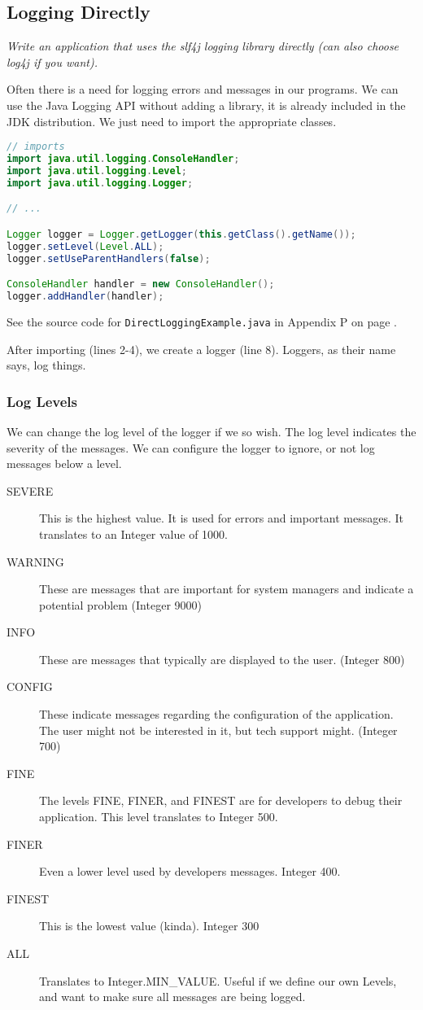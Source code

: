 \subsection{Logging Directly}
\textit{Write an application that uses the slf4j logging library directly (can also choose log4j if you want).}

Often there is a need for logging errors and messages in our programs. We can use the Java Logging API without adding a library, it is already included in the JDK distribution. We just need to import the appropriate classes.
\begin{lstlisting}[language=Java, label=lst:javaloggerlst]
// imports
import java.util.logging.ConsoleHandler;
import java.util.logging.Level;
import java.util.logging.Logger;

// ...

Logger logger = Logger.getLogger(this.getClass().getName());
logger.setLevel(Level.ALL);
logger.setUseParentHandlers(false);

ConsoleHandler handler = new ConsoleHandler();
logger.addHandler(handler);
\end{lstlisting}

See the source code for \texttt{DirectLoggingExample.java} in Appendix P on page \pageref{App:AppendixP}.

After importing (lines 2-4), we create a logger (line 8). Loggers, as their name says, log things. 

\subsubsection{Log Levels}
We can change the log level of the logger if we so wish. The log level indicates the severity of the messages. We can configure the logger to ignore, or not log messages below a level.
\begin{description}
\item[SEVERE] This is the highest value. It is used for errors and important messages. It translates to an Integer value of 1000.
\item[WARNING] These are messages that are important for system managers and indicate a potential problem (Integer 9000)
\item[INFO] These are messages that typically are displayed to the user. (Integer 800)
\item[CONFIG] These indicate messages regarding the configuration of the application. The user might not be interested in it, but tech support might. (Integer 700)
\item[FINE] The levels FINE, FINER, and FINEST are for developers to debug their application. This level translates to Integer 500.
\item[FINER] Even a lower level used by developers messages. Integer 400.
\item[FINEST] This is the lowest value (kinda). Integer 300
\item[ALL] Translates to Integer.MIN\_VALUE. Useful if we define our own Levels, and want to make sure all messages are being logged.
\end{description}

